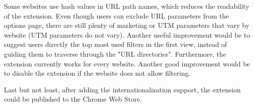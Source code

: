 Some websites use hash values in URL path names, which reduces the readability of the extension. Even though users can exclude URL parameters from the options page, there are still plenty of marketing or UTM parameters that vary by website (UTM parameters do not vary). Another useful improvement would be to suggest users directly the top most used filters in the first view, instead of guiding them to traverse through the "URL directories". Furthermore, the extension currently works for every website. Another good improvement would be to disable the extension if the website does not allow filtering.

Last but not least, after adding the internationalization support, the extension could be published to the Chrome Web Store.
